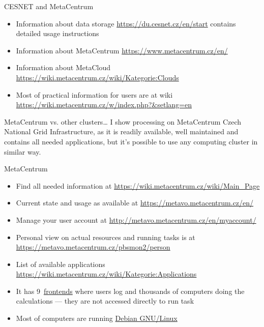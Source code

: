 \documentclass[compress, ucs, xelatex, 11pt, xcolor=x11names, aspectratio=169,
	hyperref={
		bookmarks=true,
		unicode=true,
		colorlinks=true,
		pdftitle={HybSeq course},
		plainpages=false,
		pdfauthor={Vojtech Zeisek},
		pdfsubject={Practical processing of HybSeq target enrichment sequencing data on computing grids like MetaCentrum},
		pdfcreator={XeLaTeX},
		pdfkeywords={BASH, command line, GNU, HybSeq, Linux, MetaCentrum, sequencing shell, target enrichment},
		linkcolor=Cyan2, %
		anchorcolor=Firebrick2, %
		citecolor=Firebrick2, %
		filecolor=Firebrick2, %
		menucolor=Firebrick2, %
		urlcolor=Chartreuse2, %
		pdftex},
	url={hyphens, lowtilde} %
	]{beamer}
\begin{document}
\begin{frame}[allowframebreaks]{CESNET and MetaCentrum}
\begin{itemize}
		\begin{itemize}
			\item To use MetaCentrum fill registration form \url{https://metavo.metacentrum.cz/en/application/form}
			\item To use data storage fill registration form \url{https://einfra.cesnet.cz/perun-registrar-fed/?vo=storage}
			\item After registration for MetaCentrum, user can join MetaCloud via \url{https://perun.metacentrum.cz/fed/registrar/?vo=meta&group=metacloud}
			\item Users not having access to \href{https://www.eduid.cz/en/index}{EduID} have to register first at HostelID \url{http://hostel.eduid.cz/en/index.html}
		\end{itemize}
		\item Information about data storage \url{https://du.cesnet.cz/en/start} contains detailed usage instructions
		\item Information about MetaCentrum \url{https://www.metacentrum.cz/en/}
		\item Information about MetaCloud \url{https://wiki.metacentrum.cz/wiki/Kategorie:Clouds}
		\item Most of practical information for users are at wiki \url{https://wiki.metacentrum.cz/w/index.php?&setlang=en}
	\end{itemize}
	\vfill
	\begin{alertblock}{MetaCentrum vs. other clusters\ldots}
		I show processing on MetaCentrum Czech National Grid Infrastructure, as it is readily available, well maintained and contains all needed applications, but it's possible to use any computing cluster in similar way.
	\end{alertblock}
	\vfill
\end{frame}

\begin{frame}{MetaCentrum}
	\begin{itemize}
		\item Find all needed information at \url{https://wiki.metacentrum.cz/wiki/Main_Page}
		\item Current state and usage as available at \url{https://metavo.metacentrum.cz/en/}
		\item Manage your user account at \url{http://metavo.metacentrum.cz/en/myaccount/}
		\item Personal view on actual resources and running tasks is at \url{https://metavo.metacentrum.cz/pbsmon2/person}
		\item List of available applications \url{https://wiki.metacentrum.cz/wiki/Kategorie:Applications}
		\item It has 9~\href{https://wiki.metacentrum.cz/wiki/Frontend}{frontends} where users log and thousands of computers doing the calculations --- they are not accessed directly to run task
		\item Most of computers are running \href{https://www.debian.org/}{Debian GNU/Linux}
	\end{itemize}
\end{frame}
\end{document}

